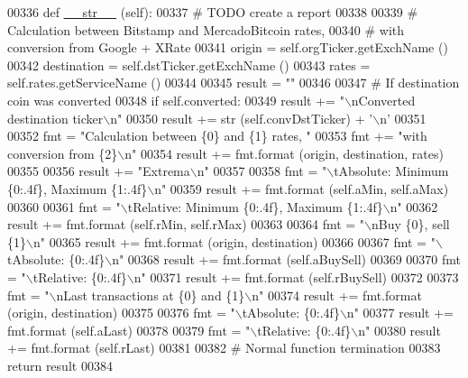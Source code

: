 \begin{DoxyCode}
00336     \textcolor{keyword}{def }\hyperlink{namespacerates_a2f1a70c33ee9e255938e4c19fd207264}{\_\_str\_\_} (self):
00337         \textcolor{comment}{# TODO create a report }
00338     
00339         \textcolor{comment}{# Calculation between Bitstamp and MercadoBitcoin rates, }
00340         \textcolor{comment}{# with conversion from Google + XRate}
00341         origin      = self.orgTicker.getExchName ()
00342         destination = self.dstTicker.getExchName ()
00343         rates       = self.rates.getServiceName ()
00344         
00345         result = \textcolor{stringliteral}{""}
00346         
00347         \textcolor{comment}{# If destination coin was converted}
00348         \textcolor{keywordflow}{if} self.converted:
00349             result += \textcolor{stringliteral}{"\(\backslash\)nConverted destination ticker\(\backslash\)n"}
00350             result += str (self.convDstTicker) + \textcolor{stringliteral}{'\(\backslash\)n'}
00351         
00352         fmt     = \textcolor{stringliteral}{"Calculation between \{0\} and \{1\} rates, "}
00353         fmt    += \textcolor{stringliteral}{"with conversion from \{2\}\(\backslash\)n"}
00354         result += fmt.format (origin, destination, rates)
00355         
00356         result += \textcolor{stringliteral}{"Extrema\(\backslash\)n"}
00357         
00358         fmt = \textcolor{stringliteral}{"\(\backslash\)tAbsolute: Minimum \{0:.4f\}, Maximum \{1:.4f\}\(\backslash\)n"}
00359         result += fmt.format (self.aMin, self.aMax)
00360         
00361         fmt = \textcolor{stringliteral}{"\(\backslash\)tRelative: Minimum \{0:.4f\}, Maximum \{1:.4f\}\(\backslash\)n"}
00362         result += fmt.format (self.rMin, self.rMax)
00363         
00364         fmt = \textcolor{stringliteral}{"\(\backslash\)nBuy \{0\}, sell \{1\}\(\backslash\)n"}
00365         result += fmt.format (origin, destination)
00366         
00367         fmt = \textcolor{stringliteral}{"\(\backslash\)tAbsolute: \{0:.4f\}\(\backslash\)n"}
00368         result += fmt.format (self.aBuySell)
00369         
00370         fmt = \textcolor{stringliteral}{"\(\backslash\)tRelative: \{0:.4f\}\(\backslash\)n"}
00371         result += fmt.format (self.rBuySell)
00372         
00373         fmt = \textcolor{stringliteral}{"\(\backslash\)nLast transactions at \{0\} and \{1\}\(\backslash\)n"}
00374         result += fmt.format (origin, destination)
00375         
00376         fmt = \textcolor{stringliteral}{"\(\backslash\)tAbsolute: \{0:.4f\}\(\backslash\)n"}
00377         result += fmt.format (self.aLast)
00378         
00379         fmt = \textcolor{stringliteral}{"\(\backslash\)tRelative: \{0:.4f\}\(\backslash\)n"}
00380         result += fmt.format (self.rLast)
00381                 
00382         \textcolor{comment}{# Normal function termination}
00383         \textcolor{keywordflow}{return} result
00384     
\end{DoxyCode}
\mbox{\label{classexchange_1_1_diff_tracker_a5289683bd2bd43e75e0062704df53736}} 
